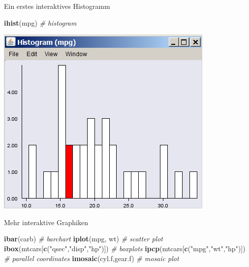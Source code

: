 \documentclass[
  ignorenonframetext,
]{beamer}
\newenvironment{Shaded}{}{}
\newcommand{\CommentTok}[1]{\textcolor[rgb]{0.38,0.63,0.69}{\textit{#1}}}
\newcommand{\KeywordTok}[1]{\textcolor[rgb]{0.00,0.44,0.13}{\textbf{#1}}}
\newcommand{\NormalTok}[1]{#1}
\newcommand{\StringTok}[1]{\textcolor[rgb]{0.25,0.44,0.63}{#1}}
\begin{document}
\begin{frame}[fragile]{Ein erstes interaktives Histogramm}
\protect\hypertarget{ein-erstes-interaktives-histogramm}{}

\begin{Shaded}
\begin{Highlighting}[]
\KeywordTok{ihist}\NormalTok{(mpg) }\CommentTok{# histogram}
\end{Highlighting}
\end{Shaded}

\includegraphics{figure/ihist.PNG}

\end{frame}

\begin{frame}[fragile]{Mehr interaktive Graphiken}
\protect\hypertarget{mehr-interaktive-graphiken}{}

\begin{Shaded}
\begin{Highlighting}[]
\KeywordTok{ibar}\NormalTok{(carb) }\CommentTok{# barchart}
\KeywordTok{iplot}\NormalTok{(mpg, wt) }\CommentTok{# scatter plot}
\KeywordTok{ibox}\NormalTok{(mtcars[}\KeywordTok{c}\NormalTok{(}\StringTok{"qsec"}\NormalTok{,}\StringTok{"disp"}\NormalTok{,}\StringTok{"hp"}\NormalTok{)]) }\CommentTok{# boxplots}
\KeywordTok{ipcp}\NormalTok{(mtcars[}\KeywordTok{c}\NormalTok{(}\StringTok{"mpg"}\NormalTok{,}\StringTok{"wt"}\NormalTok{,}\StringTok{"hp"}\NormalTok{)]) }\CommentTok{# parallel coordinates}
\KeywordTok{imosaic}\NormalTok{(cyl.f,gear.f) }\CommentTok{# mosaic plot }
\end{Highlighting}
\end{Shaded}

\end{frame}
\end{document}
